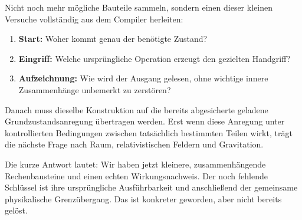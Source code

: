 \documentclass[
  ngerman,
  10pt,
  a4paper,
]{article}
\providecommand{\tightlist}{%
  \setlength{\itemsep}{0pt}\setlength{\parskip}{0pt}}
\begin{document}
Nicht noch mehr mögliche Bauteile sammeln, sondern einen dieser kleinen
Versuche vollständig aus dem Compiler herleiten:

\begin{enumerate}
\def\labelenumi{\arabic{enumi}.}
\tightlist
\item
  \textbf{Start:} Woher kommt genau der benötigte Zustand?
\item
  \textbf{Eingriff:} Welche ursprüngliche Operation erzeugt den
  gezielten Handgriff?
\item
  \textbf{Aufzeichnung:} Wie wird der Ausgang gelesen, ohne wichtige
  innere Zusammenhänge unbemerkt zu zerstören?
\end{enumerate}

Danach muss dieselbe Konstruktion auf die bereits abgesicherte geladene
Grundzustandsanregung übertragen werden. Erst wenn diese Anregung unter
kontrollierten Bedingungen zwischen tatsächlich bestimmten Teilen wirkt,
trägt die nächste Frage nach Raum, relativistischen Feldern und
Gravitation.

Die kurze Antwort lautet: Wir haben jetzt kleinere, zusammenhängende
Rechenbausteine und einen echten Wirkungsnachweis. Der noch fehlende
Schlüssel ist ihre ursprüngliche Ausführbarkeit und anschließend der
gemeinsame physikalische Grenzübergang. Das ist konkreter geworden, aber
nicht bereits gelöst.
\end{document}
